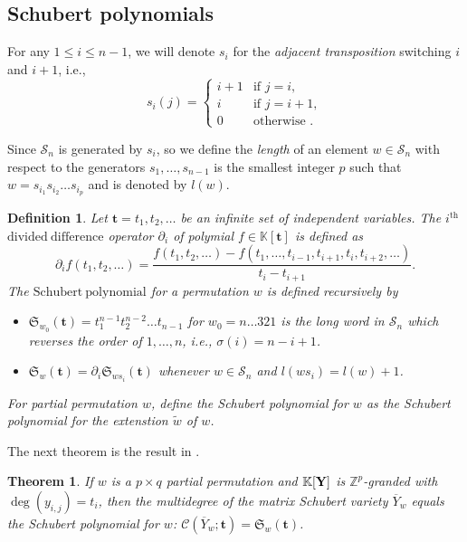 \documentclass[11pt]{article}
\numberwithin{Property}{section}
\newtheorem{Theorem}{Theorem}%
\numberwithin{Theorem}{section}
\numberwithin{Proposition}{section}
\numberwithin{Lemma}{section}
\numberwithin{Corollary}{section}
\newtheorem{Definition}{Definition}%
\numberwithin{Definition}{section}
\numberwithin{Remark}{section}
\numberwithin{Conjecture}{section}
\numberwithin{Problem}{section}
\numberwithin{Example}{section}
\numberwithin{Claim}{section}
\renewcommand{\leq}{\leqslant}
\def\bar{\overline}
\newcommand{\field}{\mathbb{K}} %
\newcommand{\mat}[1]{\mathbf{\MakeUppercase{#1}}} %
\begin{document}
\subsection{Schubert polynomials}
For any $1 \leq i \leq n-1$, we will denote $s_i$ for the \emph{adjacent transposition} switching $i$ and $i+1$, i.e.,
\[
s_i(j)=
\begin{cases}
i + 1  & \text{if } j = i,\\
i  & \text{if } j = i+1,\\
0 & \text{otherwise }.
\end{cases}
\] 

Since $\mathcal{S}_n$ is generated by $s_i$, so we define the \emph{length} of an element $w \in \mathcal{S}_n$ with respect to the generators $s_1, \ldots, s_{n-1}$ is the smallest integer $p$ such that $w = s_{i_1}s_{i_2}\ldots s_{i_p}$ and is denoted by $l(w)$. 

\begin{Definition} Let $\mathbf{t} = t_1, t_2, \ldots $ be an infinite set of independent variables. The $i^{\mathrm{th}}$ $\mathrm{divided \ difference}$ operator $\partial_i$ of polymial $f \in \field[\mathbf{t}]$ is defined as 
\[
\partial_if(t_1, t_2, \ldots) = \frac{f(t_1, t_2, \ldots) - f(t_1, \ldots, t_{i-1}, t_{i+1}, t_i, t_{i+2}, \ldots)}{t_i - t_{i+1}}.
\]
The $\mathrm{Schubert \ polynomial}$  for a permutation $w$ is defined recursively by 
\begin{itemize}
\item[•] $\mathfrak{S}_{w_0}(\mathbf{t}) = t_{1}^{n-1}t_2^{n-2} \ldots t_{n-1}$ for $w_0 = n\ldots 321$ is the long word in $\mathcal{S}_n$ which reverses the order of $1, \ldots, n$, i.e., $\sigma(i) = n-i+1$. 
\item[•] $\mathfrak{S}_w(\mathbf{t}) = \partial_i\mathfrak{S}_{ws_i}(\mathbf{t})$ whenever $w \in  \mathcal{S}_n$ and $l(ws_i) = l(w) + 1$. 
\end{itemize}
For partial permutation $w$, define the Schubert polynomial for $w$ as the Schubert polynomial for the extenstion $\tilde{w}$ of $w$. 
\end{Definition}
The next theorem is the result in \cite[corollary ~ 15.44]{Miller04}. 
\begin{Theorem} \label{TM} If $w$ is a $p \times q$ partial permutation and $\field[\mat{Y}]$ is $\mathbb{Z}^p$-granded with $\deg(y_{i,j}) = t_i$, then the multidegree of the matrix Schubert variety $\bar{Y}_w$ equals the Schubert polynomial for $w$: $\mathcal{C}(\bar{Y}_w;\mathbf{t}) = \mathfrak{S}_w(\mathbf{t})$. 
\end{Theorem}
\end{document}
